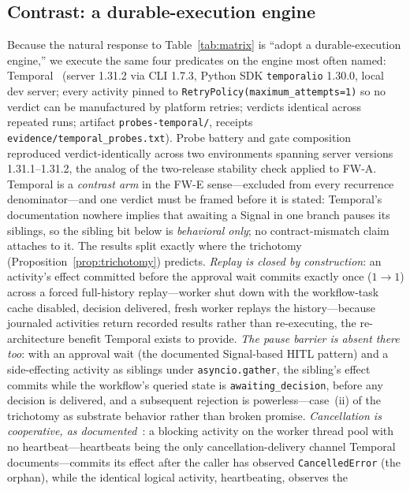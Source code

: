 \documentclass[10pt,journal,compsoc]{IEEEtran}
\begin{document}
\subsection{Contrast: a durable-execution engine}
\label{sec:temporal}
Because the natural response to Table~\ref{tab:matrix} is ``adopt a
durable-execution engine,'' we execute the same four predicates on the engine
most often named: Temporal~\cite{temporal} (server 1.31.2 via CLI 1.7.3,
Python SDK \texttt{temporalio} 1.30.0, local dev server; every activity
pinned to \texttt{RetryPolicy(maximum\_attempts=1)} so no verdict can be
manufactured by platform retries; verdicts identical across repeated runs;
artifact \texttt{probes-temporal/}, receipts
\texttt{evidence/temporal\_probes.txt}). Probe battery and gate composition reproduced verdict-identically across two environments spanning server versions 1.31.1--1.31.2, the analog of the two-release stability check applied to \textsf{FW-A}.
Temporal is a \emph{contrast arm} in the \textsf{FW-E} sense---excluded from
every recurrence denominator---and one verdict must be framed before it is
stated: Temporal's documentation nowhere implies that awaiting a Signal in
one branch pauses its siblings, so the sibling bit below is \emph{behavioral
only}; no contract-mismatch claim attaches to it. The results split exactly
where the trichotomy (Proposition~\ref{prop:trichotomy}) predicts.
\emph{Replay is closed by construction}: an activity's effect committed
before the approval wait commits exactly once ($1{\to}1$) across a forced
full-history replay---worker shut down with the workflow-task cache
disabled, decision delivered, fresh worker replays the history---because
journaled activities return recorded results rather than re-executing, the
re-architecture benefit Temporal exists to provide. \emph{The pause barrier
is absent there too}: with an approval wait (the documented Signal-based
HITL pattern) and a side-effecting activity as siblings under
\texttt{asyncio.gather}, the sibling's effect commits while the workflow's
queried state is \texttt{awaiting\_decision}, before any decision is
delivered, and a subsequent rejection is powerless---case~(ii) of the
trichotomy as substrate behavior rather than broken promise.
\emph{Cancellation is cooperative, as documented}~\cite{temporal-docs}: a
blocking activity on the worker thread pool with no heartbeat---heartbeats
being the only cancellation-delivery channel Temporal documents---commits
its effect after the caller has observed \texttt{CancelledError} (the
orphan), while the identical logical activity, heartbeating, observes the
\end{document}
